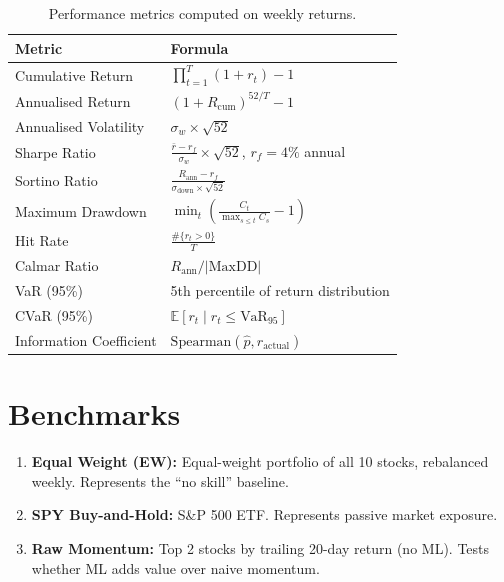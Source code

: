 \documentclass[12pt,a4paper]{article}
\begin{document}
\begin{table}[H]
\centering
\caption{Performance metrics computed on weekly returns.}
\small
\begin{tabular}{ll}
\toprule
\textbf{Metric} & \textbf{Formula} \\
\midrule
Cumulative Return & $\prod_{t=1}^{T}(1 + r_t) - 1$ \\[4pt]
Annualised Return & $(1 + R_{\text{cum}})^{52/T} - 1$ \\[4pt]
Annualised Volatility & $\sigma_w \times \sqrt{52}$ \\[4pt]
Sharpe Ratio & $\frac{\bar{r} - r_f}{\sigma_w} \times \sqrt{52}$, \; $r_f = 4\%$ annual \\[4pt]
Sortino Ratio & $\frac{R_{\text{ann}} - r_f}{\sigma_{\text{down}} \times \sqrt{52}}$ \\[4pt]
Maximum Drawdown & $\min_t \left(\frac{C_t}{\max_{s \leq t} C_s} - 1\right)$ \\[4pt]
Hit Rate & $\frac{\#\{r_t > 0\}}{T}$ \\[4pt]
Calmar Ratio & $R_{\text{ann}} / |\text{MaxDD}|$ \\[4pt]
VaR (95\%) & 5th percentile of return distribution \\[4pt]
CVaR (95\%) & $\mathbb{E}[r_t \mid r_t \leq \text{VaR}_{95}]$ \\[4pt]
Information Coefficient & $\text{Spearman}(\hat{p}, r_{\text{actual}})$ \\
\bottomrule
\end{tabular}
\end{table}

\section{Benchmarks}

\begin{enumerate}
    \item \textbf{Equal Weight (EW):} Equal-weight portfolio of all 10 stocks, rebalanced weekly. Represents the ``no skill'' baseline.
    \item \textbf{SPY Buy-and-Hold:} S\&P 500 ETF. Represents passive market exposure.
    \item \textbf{Raw Momentum:} Top 2 stocks by trailing 20-day return (no ML). Tests whether ML adds value over naive momentum.
\end{enumerate}
\end{document}
